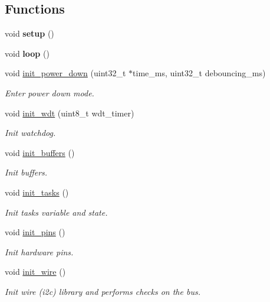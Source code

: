 \subsection*{Functions}
\begin{DoxyCompactItemize}
\item 
\mbox{\label{i2c-th_8ino_a4fc01d736fe50cf5b977f755b675f11d}} 
void {\bfseries setup} ()
\item 
\mbox{\label{i2c-th_8ino_afe461d27b9c48d5921c00d521181f12f}} 
void {\bfseries loop} ()
\item 
void \hyperlink{i2c-th_8ino_afb98a0f07c30784284f48271ffe02b97}{init\+\_\+power\+\_\+down} (uint32\+\_\+t $\ast$time\+\_\+ms, uint32\+\_\+t debouncing\+\_\+ms)
\begin{DoxyCompactList}\small\item\em Enter power down mode. \end{DoxyCompactList}\item 
void \hyperlink{i2c-th_8ino_a980e73df66b14b1190bc25da430a4f12}{init\+\_\+wdt} (uint8\+\_\+t wdt\+\_\+timer)
\begin{DoxyCompactList}\small\item\em Init watchdog. \end{DoxyCompactList}\item 
void \hyperlink{i2c-th_8ino_ad241cc00b1a92e6d85827df96778e442}{init\+\_\+buffers} ()
\begin{DoxyCompactList}\small\item\em Init buffers. \end{DoxyCompactList}\item 
void \hyperlink{i2c-th_8ino_ab4bf0a3d77da083f131d3fa35a37d2b1}{init\+\_\+tasks} ()
\begin{DoxyCompactList}\small\item\em Init tasks variable and state. \end{DoxyCompactList}\item 
void \hyperlink{i2c-th_8ino_ad8b80a0c08f928106018edd6ea435b95}{init\+\_\+pins} ()
\begin{DoxyCompactList}\small\item\em Init hardware pins. \end{DoxyCompactList}\item 
void \hyperlink{i2c-th_8ino_a2441543100bf8421f56edd622a2c1d9a}{init\+\_\+wire} ()
\begin{DoxyCompactList}\small\item\em Init wire (i2c) library and performs checks on the bus. \end{DoxyCompactList}\item 

\end{DoxyCompactItemize}
